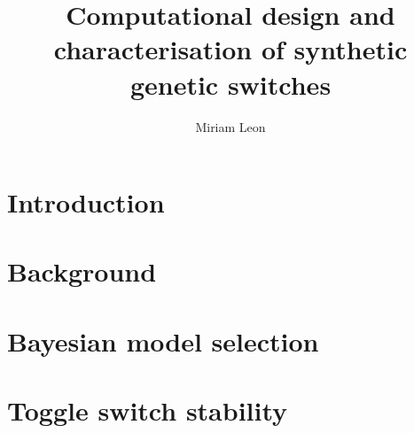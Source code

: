 \documentclass[]{phdthesis}
\title{Computational design and\\[0.2em]characterisation of synthetic\\[0.2em] genetic switches}
\author{Miriam Leon}
\begin{document}
\maketitle


\begin{abstract}
\end{abstract}

\tableofcontents*
\listoffigures
\listoftables
{}

\printglossary[type=\acronymtype, title=Abbreviations, toctitle=Abbreviations]

\begin{acknowledgements}
\end{acknowledgements}


\mainmatter*
\chapter{Introduction}


\mainmatter*
\chapter{Background}


\mainmatter*
\chapter{Bayesian model selection}



\mainmatter*
\chapter{Toggle switch stability}

%
%
%
%
%
\end{document}
